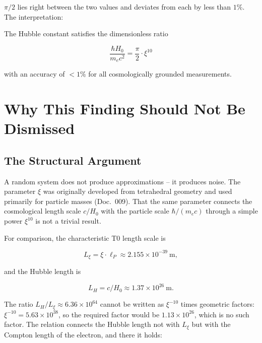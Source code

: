$\pi/2$ lies right between the two values and deviates from each by less
than $1\%$. The interpretation:

\begin{keyresult}
    The Hubble constant satisfies the dimensionless ratio

    \begin{equation}
        \frac{\hbar H_0}{m_e c^2} = \frac{\pi}{2} \cdot \xi^{10}
        \label{eq:ratio_central}
    \end{equation}

    with an accuracy of $<1\%$ for all cosmologically grounded
    measurements.
\end{keyresult}

\section{Why This Finding Should Not Be Dismissed}
\label{sec:argument}

\subsection{The Structural Argument}

A random system does not produce approximations -- it produces noise.
The parameter $\xi$ was originally developed from tetrahedral geometry
and used primarily for particle masses (Doc.~009). That the same
parameter connects the cosmological length scale $c/H_0$ with the
particle scale $\hbar/(m_e c)$ through a simple power $\xi^{10}$
is not a trivial result.

For comparison, the characteristic T0 length scale is

\begin{equation}
    L_\xi = \xi \cdot \ell_P \approx 2.155 \times 10^{-39}\ \text{m},
\end{equation}

and the Hubble length is

\begin{equation}
    L_H = c / H_0 \approx 1.37 \times 10^{26}\ \text{m}.
\end{equation}

The ratio $L_H / L_\xi \approx 6.36 \times 10^{64}$ cannot be written as
$\xi^{-10}$ times geometric factors: $\xi^{-10} = 5.63\times10^{38}$, so the required
factor would be $1.13\times10^{26}$, which is no such factor. The relation connects
the Hubble length not with $L_\xi$ but with the Compton length of the electron, and
there it holds:

